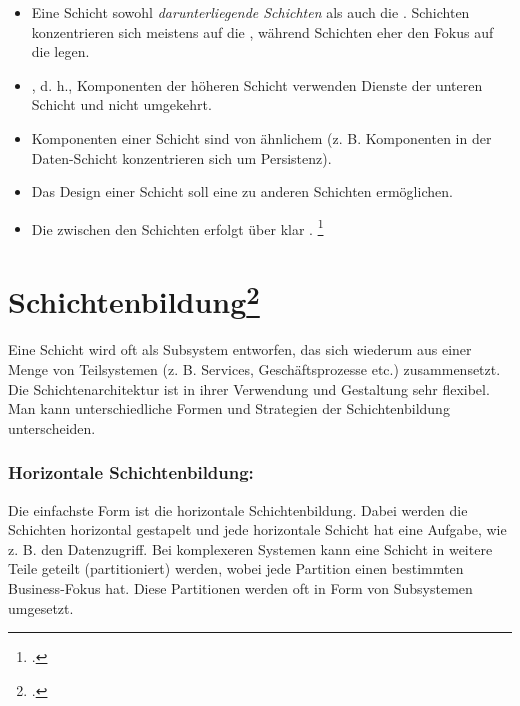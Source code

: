 \documentclass{lehramt-informatik-haupt}
\begin{document}
\begin{itemize}
\item Eine Schicht  sowohl \emph{darunterliegende
Schichten} als auch die . 
Schichten konzentrieren sich meistens auf die , während
 Schichten eher den Fokus auf die
 legen.

\item {}, d. h., Komponenten der höheren
Schicht verwenden Dienste der unteren Schicht und nicht umgekehrt.

\item Komponenten  einer Schicht sind von ähnlichem
 (z. B. Komponenten in der Daten-Schicht
konzentrieren sich um Persistenz).

\item Das Design einer Schicht soll eine  zu
anderen Schichten ermöglichen.

\item Die  zwischen den Schichten erfolgt über klar
.
\footcite[Seite 211]{schatten}
\end{itemize}

%

\section{Schichtenbildung\footcite[Seite 11]{sosy:fs:4}}

Eine Schicht wird oft als Subsystem entworfen, das sich wiederum aus
einer Menge von Teilsystemen (z. B. Services, Geschäftsprozesse etc.)
zusammensetzt. Die Schichtenarchitektur ist in ihrer Verwendung und
Gestaltung sehr flexibel. Man kann unterschiedliche Formen und
Strategien der Schichtenbildung unterscheiden.

\subsubsection{Horizontale Schichtenbildung:}

Die einfachste Form ist die horizontale Schichtenbildung. Dabei werden
die Schichten horizontal gestapelt und jede horizontale Schicht hat
eine Aufgabe, wie z. B. den Datenzugriff. Bei komplexeren Systemen
kann eine Schicht in weitere Teile geteilt (partitioniert) werden,
wobei jede Partition einen bestimmten Business-Fokus hat. Diese
Partitionen werden oft in Form von Subsystemen umgesetzt.
\end{document}
